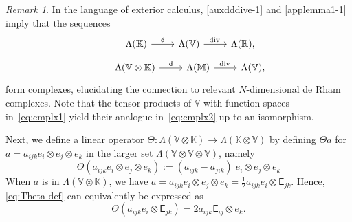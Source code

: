 \documentclass[12pt]{amsart}
\numberwithin{equation}{section}
\theoremstyle{definition}
\theoremstyle{remark}
\newtheorem{remark}[theorem]{Remark}
\newcommand{\R}{\mathbb{R}}
\newcommand{\V}{\mathbb{V}}
\newcommand{\M}{\mathbb{M}}
\newcommand{\K}{\mathbb{K}}
\renewcommand{\(}{\bigl(}
\renewcommand{\)}{\bigr)}
\newcommand{\EK}{\mathsf{E}}
\newcommand{\dd}{\mathsf{d}}
\newcommand{\dive}{{\ensuremath\mathop{\mathrm{div}\,}}} %
\begin{document}
\begin{remark}
In the language of exterior calculus, \eqref{auxdddive-1} and
\eqref{applemma1-1} imply that the sequences
\begin{equation}
  \label{eq:cmplx1}
      \begin{tikzcd}
        & \Lambda(\K)
        \arrow{r}{\dd}
        &
        \Lambda(\V)
        \arrow{r}{\dive}
        & \Lambda(\R),
      \end{tikzcd}
\end{equation}
\begin{equation}
  \label{eq:cmplx2}
      \begin{tikzcd}
        & \Lambda(\V \otimes \K)
        \arrow{r}{\dd}
        &
        \Lambda(\M)
        \arrow{r}{\dive}
        & \Lambda(\V),
      \end{tikzcd}
\end{equation}
form complexes, elucidating the connection to relevant $N$-dimensional
de Rham complexes. Note that the tensor products of $\V$ with function
spaces in~\eqref{eq:cmplx1} yield their analogue in~\eqref{eq:cmplx2}
up to an isomorphism.  
\end{remark}

Next, we define a linear operator
$\Theta: \Lambda(\V \otimes \K) \rightarrow \Lambda(\K \otimes \V)$ by defining
$\Theta a$ for $a = a_{ijk} e_i \otimes e_j \otimes e_k$ in the larger
set $\Lambda(\V \otimes \V \otimes \V)$, namely 
\begin{equation}
  \label{eq:Theta-def}
  \Theta (a_{ijk} e_i \otimes e_j \otimes e_k)  := (a_{ijk} - a_{jik}) \; e_i \otimes e_j \otimes e_k  %
\end{equation}
When $a$ is in $\Lambda(\V \otimes \K)$, we have 
$a = a_{ijk} e_i \otimes e_j \otimes e_k = \frac 1 2 a_{ijk} e_i
\otimes \EK_{jk}$. Hence, \eqref{eq:Theta-def} can equivalently be expressed as 
\begin{equation}
  \label{eq:Theta-def-2}
\Theta (a_{ijk} e_i \otimes \EK_{jk}) = 2 a_{ijk} \EK_{ij} \otimes
e_k.  
\end{equation}
\end{document}
